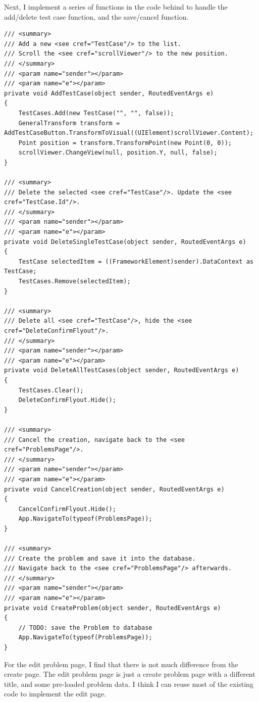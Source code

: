 \documentclass[a4paper]{report}
\begin{document}
Next, I implement a series of functions in the code behind to handle the add/delete test case function, and the save/cancel function.

\begin{verbatim}
/// <summary>
/// Add a new <see cref="TestCase"/> to the list.
/// Scroll the <see cref="scrollViewer"/> to the new position.
/// </summary>
/// <param name="sender"></param>
/// <param name="e"></param>
private void AddTestCase(object sender, RoutedEventArgs e)
{
    TestCases.Add(new TestCase("", "", false));
    GeneralTransform transform = AddTestCaseButton.TransformToVisual((UIElement)scrollViewer.Content);
    Point position = transform.TransformPoint(new Point(0, 0));
    scrollViewer.ChangeView(null, position.Y, null, false);
}

/// <summary>
/// Delete the selected <see cref="TestCase"/>. Update the <see cref="TestCase.Id"/>.
/// </summary>
/// <param name="sender"></param>
/// <param name="e"></param>
private void DeleteSingleTestCase(object sender, RoutedEventArgs e)
{
    TestCase selectedItem = ((FrameworkElement)sender).DataContext as TestCase;
    TestCases.Remove(selectedItem);
}

/// <summary>
/// Delete all <see cref="TestCase"/>, hide the <see cref="DeleteConfirmFlyout"/>.
/// </summary>
/// <param name="sender"></param>
/// <param name="e"></param>
private void DeleteAllTestCases(object sender, RoutedEventArgs e)
{
    TestCases.Clear();
    DeleteConfirmFlyout.Hide();
}

/// <summary>
/// Cancel the creation, navigate back to the <see cref="ProblemsPage"/>.
/// </summary>
/// <param name="sender"></param>
/// <param name="e"></param>
private void CancelCreation(object sender, RoutedEventArgs e)
{
    CancelConfirmFlyout.Hide();
    App.NavigateTo(typeof(ProblemsPage));
}

/// <summary>
/// Create the problem and save it into the database.
/// Navigate back to the <see cref="ProblemsPage"/> afterwards.
/// </summary>
/// <param name="sender"></param>
/// <param name="e"></param>
private void CreateProblem(object sender, RoutedEventArgs e)
{
    // TODO: save the Problem to database
    App.NavigateTo(typeof(ProblemsPage));
}
\end{verbatim}

For the edit problem page, I find that there is not much difference from the create page. The edit problem page is just a create problem page with a different title, and some pre-loaded problem data. I think I can reuse most of the existing code to implement the edit page.
\end{document}
